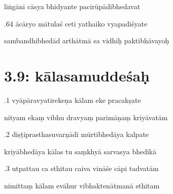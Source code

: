\documentclass[article,12pt,a4paper]{memoir}%
\newcounter{parCount}
\begin{document}
	  
	  \pstart \leavevmode%
	liṅgāni cāsya bhidyante pacirūpādibhedavat 
	{}
	\pend%
      

	  
	  \pstart {}.64 ācāryo mātulaś ceti yathaiko vyapadiśyate 
	{}
	\pend%
      

	  
	  \pstart \leavevmode%
	sambandhibhedād arthātmā sa vidhiḥ paktibhāvayoḥ 
	{}
	\pend%
      
	  
	
\chapter[{3.9: kālasamuddeśaḥ}][{3.9: kālasamuddeśaḥ}]{ 3.9: kālasamuddeśaḥ}

	  
	  \pstart {}.1 vyāpāravyatirekeṇa kālam eke pracakṣate 
	{}
	\pend%
      

	  
	  \pstart \leavevmode%
	nityam ekaṃ vibhu dravyaṃ parimāṇaṃ kriyāvatām 
	{}
	\pend%
      

	  
	  \pstart {}.2 diṣṭiprasthasuvarṇādi mūrtibhedāya kalpate 
	{}
	\pend%
      

	  
	  \pstart \leavevmode%
	kriyābhedāya kālas tu saṃkhyā sarvasya bhedikā 
	{}
	\pend%
      

	  
	  \pstart {}.3 utpattau ca sthitau caiva vināśe cāpi tadvatām 
	{}
	\pend%
      

	  
	  \pstart \leavevmode%
	nimittaṃ kālam evāhur vibhaktenātmanā sthitam 
	{}
	\pend%
      
\end{document}
